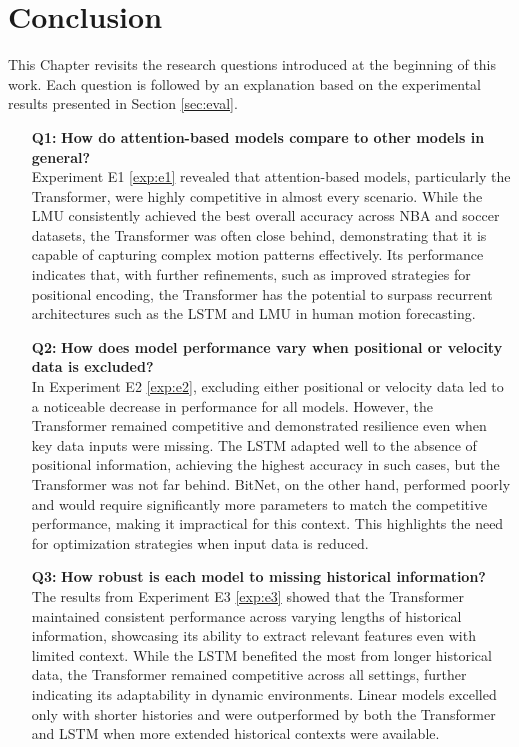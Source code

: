 \chapter{Conclusion}
\label{chapt:conclusion}
This Chapter revisits the research questions introduced at the beginning of this work. Each question is followed by an explanation based on the experimental results presented in Section \ref{sec:eval}.

\begin{itemize}
    \item[\textbf{Q1:}] \textbf{How do attention-based models compare to other models in general?} \\
    Experiment E1 \ref{exp:e1} revealed that attention-based models, particularly the Transformer, were highly competitive in almost every scenario. While the LMU consistently achieved the best overall accuracy across NBA and soccer datasets, the Transformer was often close behind, demonstrating that it is capable of capturing complex motion patterns effectively. Its performance indicates that, with further refinements, such as improved strategies for positional encoding, the Transformer has the potential to surpass recurrent architectures such as the LSTM and LMU in human motion forecasting.

    \item[\textbf{Q2:}] \textbf{How does model performance vary when positional or velocity data is excluded?} \\
    In Experiment E2 \ref{exp:e2}, excluding either positional or velocity data led to a noticeable decrease in performance for all models. However, the Transformer remained competitive and demonstrated resilience even when key data inputs were missing. The LSTM adapted well to the absence of positional information, achieving the highest accuracy in such cases, but the Transformer was not far behind. BitNet, on the other hand, performed poorly and would require significantly more parameters to match the competitive performance, making it impractical for this context. This highlights the need for optimization strategies when input data is reduced.

    \item[\textbf{Q3:}] \textbf{How robust is each model to missing historical information?} \\
    The results from Experiment E3 \ref{exp:e3} showed that the Transformer maintained consistent performance across varying lengths of historical information, showcasing its ability to extract relevant features even with limited context. While the LSTM benefited the most from longer historical data, the Transformer remained competitive across all settings, further indicating its adaptability in dynamic environments. Linear models excelled only with shorter histories and were outperformed by both the Transformer and LSTM when more extended historical contexts were available.


\end{itemize}
